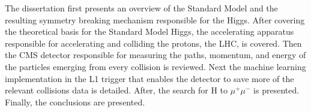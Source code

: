 The dissertation first presents an overview of the Standard Model and the resulting symmetry breaking mechanism responsible for the Higgs. After covering the theoretical basis for the Standard Model Higgs, the accelerating apparatus responsible for accelerating and colliding the protons, the LHC, is covered. Then the CMS detector responsible for measuring the paths, momentum, and energy of the particles emerging from every collision is reviewed. Next the machine learning implementation in the L1 trigger that enables the detector to save more of the relevant collisions data is detailed. After, the search for H to $\mu^{+}\mu^{-}$ is presented. Finally, the conclusions are presented.
